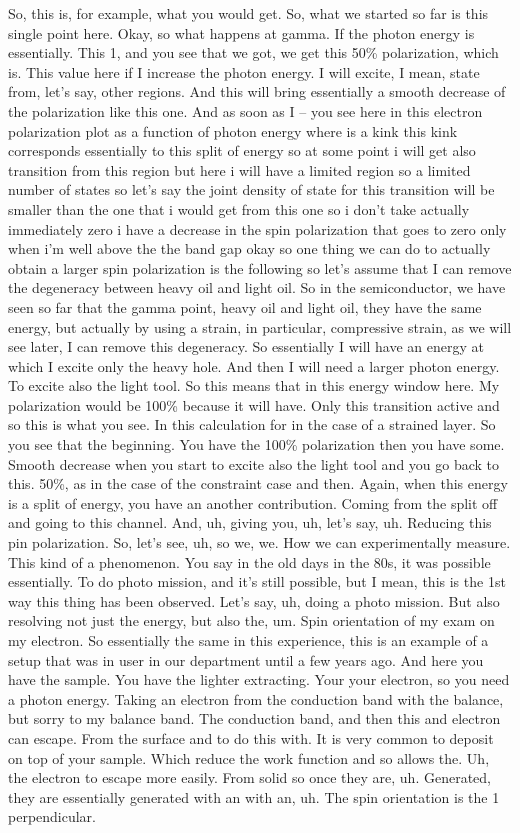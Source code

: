 So, this is, for example, what you would get. So, what we started so far is this single point here. Okay, so what happens at gamma. If the photon energy is essentially. This 1, and you see that we got, we get this 50\% polarization, which is. This value here if I increase the photon energy. I will excite, I mean, state from, let's say, other regions. And this will bring essentially a smooth decrease of the polarization like this one. And as soon as I – you see here in this electron polarization plot as a function of photon energy where is a kink this kink corresponds essentially to this split of energy so at some point i will get also transition from this region but here i will have a limited region so a limited number of states so let's say the joint density of state for this transition will be smaller than the one that i would get from this one so i don't take actually immediately zero i have a decrease in the spin polarization that goes to zero only when i'm well above the the band gap okay so one thing we can do to actually obtain a larger spin polarization is the following so let's assume that I can remove the degeneracy between heavy oil and light oil. So in the semiconductor, we have seen so far that the gamma point, heavy oil and light oil, they have the same energy, but actually by using a strain, in particular, compressive strain, as we will see later, I can remove this degeneracy. So essentially I will have an energy at which I excite only the heavy hole. And then I will need a larger photon energy. To excite also the light tool. So this means that in this energy window here. My polarization would be 100\% because it will have. Only this transition active and so this is what you see. In this calculation for in the case of a strained layer. So you see that the beginning. You have the 100\% polarization then you have some. Smooth decrease when you start to excite also the light tool and you go back to this. 50\%, as in the case of the constraint case and then. Again, when this energy is a split of energy, you have an another contribution. Coming from the split off and going to this channel. And, uh, giving you, uh, let's say, uh. Reducing this pin polarization. So, let's see, uh, so we, we. How we can experimentally measure. This kind of a phenomenon. You say in the old days in the 80s, it was possible essentially. To do photo mission, and it's still possible, but I mean, this is the 1st way this thing has been observed. Let's say, uh, doing a photo mission. But also resolving not just the energy, but also the, um. Spin orientation of my exam on my electron. So essentially the same in this experience, this is an example of a setup that was in user in our department until a few years ago. And here you have the sample. You have the lighter extracting. Your your electron, so you need a photon energy. Taking an electron from the conduction band with the balance, but sorry to my balance band. The conduction band, and then this and electron can escape. From the surface and to do this with. It is very common to deposit on top of your sample. Which reduce the work function and so allows the. Uh, the electron to escape more easily. From solid so once they are, uh. Generated, they are essentially generated with an with an, uh. The spin orientation is the 1 perpendicular. 